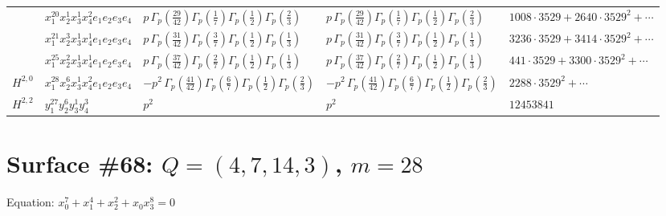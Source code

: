 \documentclass[11pt]{article}
\begin{document}
\begin{table}[ht]
{\begin{tabular}{@{}lllll@{}}
 & $x_{1}^{20} x_{2}^{1} x_{3}^{1} x_{4}^{2}  e_{1} e_{2} e_{3} e_{4}$ & $p \, \Gamma_p \left( \frac{29}{42} \right) \Gamma_p \left( \frac{1}{7} \right) \Gamma_p \left( \frac{1}{2} \right) \Gamma_p \left( \frac{2}{3} \right)$ & $p \, \Gamma_p \left( \frac{29}{42} \right) \Gamma_p \left( \frac{1}{7} \right) \Gamma_p \left( \frac{1}{2} \right) \Gamma_p \left( \frac{2}{3} \right)$ & $1008{\cdot}3529{+}2640{\cdot}3529^{2}{+}\cdots$ \\
 & $x_{1}^{21} x_{2}^{3} x_{3}^{1} x_{4}^{1}  e_{1} e_{2} e_{3} e_{4}$ & $p \, \Gamma_p \left( \frac{31}{42} \right) \Gamma_p \left( \frac{3}{7} \right) \Gamma_p \left( \frac{1}{2} \right) \Gamma_p \left( \frac{1}{3} \right)$ & $p \, \Gamma_p \left( \frac{31}{42} \right) \Gamma_p \left( \frac{3}{7} \right) \Gamma_p \left( \frac{1}{2} \right) \Gamma_p \left( \frac{1}{3} \right)$ & $3236{\cdot}3529{+}3414{\cdot}3529^{2}{+}\cdots$ \\
 & $x_{1}^{25} x_{2}^{2} x_{3}^{1} x_{4}^{1}  e_{1} e_{2} e_{3} e_{4}$ & $p \, \Gamma_p \left( \frac{37}{42} \right) \Gamma_p \left( \frac{2}{7} \right) \Gamma_p \left( \frac{1}{2} \right) \Gamma_p \left( \frac{1}{3} \right)$ & $p \, \Gamma_p \left( \frac{37}{42} \right) \Gamma_p \left( \frac{2}{7} \right) \Gamma_p \left( \frac{1}{2} \right) \Gamma_p \left( \frac{1}{3} \right)$ & $441{\cdot}3529{+}3300{\cdot}3529^{2}{+}\cdots$ \\
\midrule
$H^{2,0}$ & $x_{1}^{28} x_{2}^{6} x_{3}^{1} x_{4}^{2}  e_{1} e_{2} e_{3} e_{4}$ & $- p^{2} \, \Gamma_p \left( \frac{41}{42} \right) \Gamma_p \left( \frac{6}{7} \right) \Gamma_p \left( \frac{1}{2} \right) \Gamma_p \left( \frac{2}{3} \right)$ & $- p^{2} \, \Gamma_p \left( \frac{41}{42} \right) \Gamma_p \left( \frac{6}{7} \right) \Gamma_p \left( \frac{1}{2} \right) \Gamma_p \left( \frac{2}{3} \right)$ & $2288{\cdot}3529^{2}{+}\cdots$ \\
\midrule
$H^{2,2}$ & $y_{1}^{27} y_{2}^{6} y_{3}^{1} y_{4}^{3}$ & $p^{2} \,$ & $p^{2} \,$ & $12453841$ \\
\bottomrule
\end{tabular}
}
\renewcommand{\arraystretch}{1.0}
\end{table}

\newpage

\section*{Surface \#68: $Q=(4, 7, 14, 3)$, $m=28$}

Equation: $x_0^{7} + x_1^{4} + x_2^{2} + x_0 x_3^{8} = 0$
\end{document}
